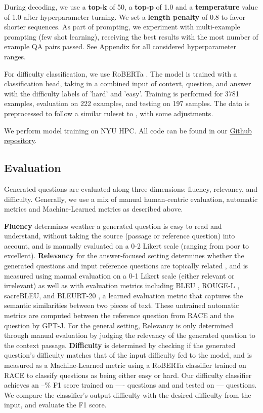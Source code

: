 \documentclass[11pt]{article}
\begin{document}
During decoding, we use a \textbf{top-k} of 50, a \textbf{top-p} of 1.0 and a \textbf{temperature} value of 1.0 after hyperparameter turning. We set a \textbf{length penalty} of 0.8 to favor shorter sequences. As part of prompting, we experiment with multi-example prompting (few shot learning), receiving the best results with the most number of example QA pairs passed. See Appendix for all considered hyperparameter ranges.  

For difficulty classification, we use RoBERTa \citep{roberta:12}. The model is trained with a classification head, taking in a combined input of context, question, and answer with the difficulty labels of 'hard' and 'easy'. Training is performed for 3781 examples, evaluation on 222 examples, and testing on 197 samples. The data is preprocessed to follow a similar ruleset to \citet{Difficulty:3}, with some adjustments.

We perform model training on NYU HPC. All code can be found in our \href{https://github.com/rbolline/Neural-Question-Generation-with-GPT-J}{Github repository}. 


\subsection{Evaluation}

Generated questions are evaluated along three dimensions: fluency, relevancy, and difficulty. Generally, we use a mix of manual human-centric evaluation, automatic metrics and Machine-Learned metrics as described above.

\textbf{Fluency} determines weather a generated question is easy to read and understand, without taking the source (passage or reference question) into account, and is manually evaluated on a 0-2 Likert scale (ranging from poor to excellent). \textbf{Relevancy} for the answer-focused setting determines whether the generated questions and input reference questions are topically related \citep{relevancy:14}, and is measured using manual evaluation on a 0-1 Likert scale (either relevant or irrelevant) as well as with evaluation metrics including BLEU \citep{BLEU:6}, ROUGE-L \citep{rouge:5}, sacreBLEU, and BLEURT-20 \citep{bleurt:7}, a learned evaluation metric that captures the semantic similarities between two pieces of text. These untrained automatic metrics are computed between the reference question from RACE and the question by GPT-J. For the general setting, Relevancy is only determined through manual evaluation by judging the relevancy of the generated question to the context passage. \textbf{Difficulty} is determined by checking if the generated question’s difficulty matches that of the input difficulty fed to the model, and is measured as a Machine-Learned metric using a RoBERTa \citep{roberta:12} classifier trained on RACE to classify questions as being either easy or hard. Our difficulty classifier achieves an --\% F1 score trained on ---- questions and and tested on --- questions. We compare the classifier's output difficulty with the desired difficulty from the input, and evaluate the F1 score.  
\end{document}
